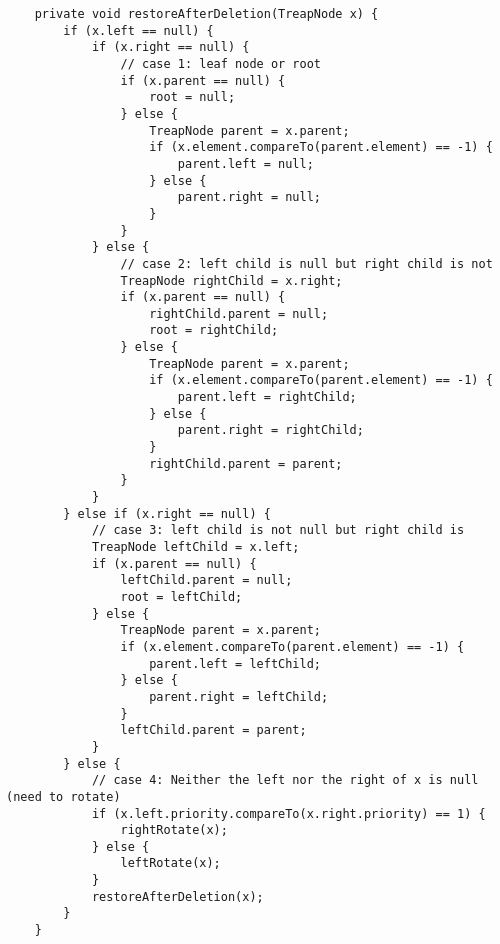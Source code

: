 \documentclass[12pt]{article}
\newenvironment{problem}[2][Problem]{\begin{trivlist}
\item[\hskip \labelsep {\bfseries #1}\hskip \labelsep {\bfseries #2.}]}{\end{trivlist}}
\begin{document}
\begin{verbatim}
    private void restoreAfterDeletion(TreapNode x) {
        if (x.left == null) {
            if (x.right == null) {
                // case 1: leaf node or root
                if (x.parent == null) {
                    root = null;
                } else {
                    TreapNode parent = x.parent;
                    if (x.element.compareTo(parent.element) == -1) {
                        parent.left = null;
                    } else {
                        parent.right = null;
                    }
                }
            } else {
                // case 2: left child is null but right child is not
                TreapNode rightChild = x.right;
                if (x.parent == null) {
                    rightChild.parent = null;
                    root = rightChild;
                } else {
                    TreapNode parent = x.parent;
                    if (x.element.compareTo(parent.element) == -1) {
                        parent.left = rightChild;
                    } else {
                        parent.right = rightChild;
                    }
                    rightChild.parent = parent;
                }
            }
        } else if (x.right == null) {
            // case 3: left child is not null but right child is
            TreapNode leftChild = x.left;
            if (x.parent == null) {
                leftChild.parent = null;
                root = leftChild;
            } else {
                TreapNode parent = x.parent;
                if (x.element.compareTo(parent.element) == -1) {
                    parent.left = leftChild;
                } else {
                    parent.right = leftChild;
                }
                leftChild.parent = parent;
            }
        } else {
            // case 4: Neither the left nor the right of x is null (need to rotate)
            if (x.left.priority.compareTo(x.right.priority) == 1) {
                rightRotate(x);
            } else {
                leftRotate(x);
            }
            restoreAfterDeletion(x);
        }
    }
\end{verbatim}


\begin{problem}{9}

\end{problem}
\end{document}
